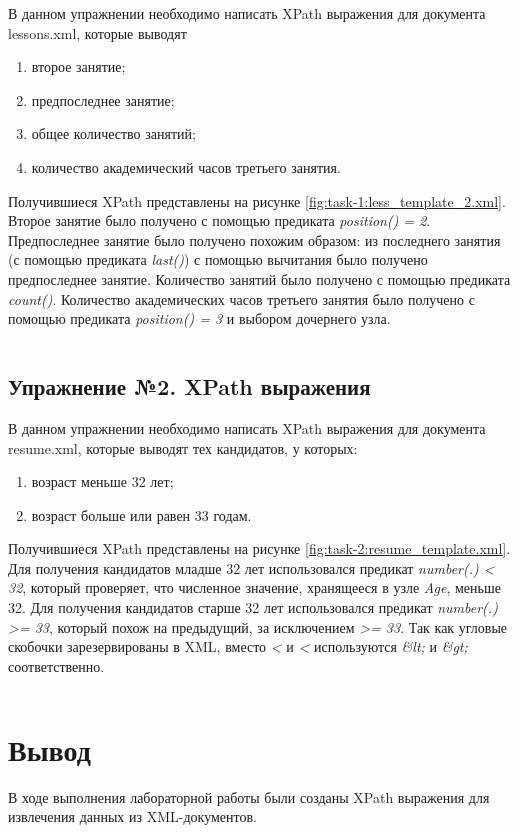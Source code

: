 \documentclass[a4paper, 14pt]{extarticle}
\begin{document}
В данном упражнении необходимо написать XPath выражения для документа
\foreignlanguage{english}{lessons.xml}, которые выводят
\begin{enumerate}
  \item второе занятие;
  \item предпоследнее занятие;
  \item общее количество занятий;
  \item количество академический часов третьего занятия.
\end{enumerate}

Получившиеся XPath представлены на рисунке \ref{fig:task-1:less_template_2.xml}.
Второе занятие было получено с помощью предиката
\foreignlanguage{english}{\textit{position() = 2}}. Предпоследнее занятие было
получено похожим образом: из последнего занятия (с помощью предиката
\foreignlanguage{english}{\textit{last()}}) с помощью вычитания было получено
предпоследнее занятие. Количество занятий было получено с помощью предиката
\foreignlanguage{english}{\textit{count()}}. Количество академических часов
третьего занятия было получено с помощью предиката
\foreignlanguage{english}{\textit{position() = 3}} и выбором дочернего узла.

\bgroup
\inputminted{xml}{../code/task-1/less_template_2.xsl}
\label{fig:task-1:less_template_2.xml}
\egroup

\subsection*{Упражнение №2. XPath выражения}

В данном упражнении необходимо написать XPath выражения для документа
\foreignlanguage{english}{resume.xml}, которые выводят тех кандидатов, у
которых:
\begin{enumerate}
  \item возраст меньше 32 лет;
  \item возраст больше или равен 33 годам.
\end{enumerate}

Получившиеся XPath представлены на рисунке \ref{fig:task-2:resume_template.xml}.
Для получения кандидатов младше 32 лет использовался предикат
\textit{\foreignlanguage{english}{number(.) < 32}}, который проверяет, что
численное значение, хранящееся в узле \textit{Age}, меньше 32. Для получения
кандидатов старше 32 лет использовался предикат
\textit{\foreignlanguage{english}{number(.) >= 33}}, который похож на
предыдущий, за исключением \textit{>= 33}. Так как угловые скобочки
зарезервированы в XML, вместо \textit{<} и \textit{<} используются \textit{\&lt;}
и \textit{\&gt;} соответственно.

\bgroup
\inputminted{xml}{../code/task-2/resume_template.xsl}
\label{fig:task-2:resume_template.xml}
\egroup

\section{Вывод}

В ходе выполнения лабораторной работы были созданы XPath выражения для
извлечения данных из XML-документов.
\end{document}
